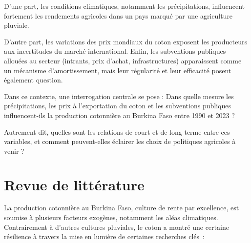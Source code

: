 \documentclass[
  letterpaper,
  DIV=11,
  numbers=noendperiod]{scrartcl}
\begin{document}
D'une part, les conditions climatiques, notamment les précipitations,
influencent fortement les rendements agricoles dans un pays marqué par
une agriculture pluviale.

D'autre part, les variations des prix mondiaux du coton exposent les
producteurs aux incertitudes du marché international. Enfin, les
subventions publiques allouées au secteur (intrants, prix d'achat,
infrastructures) apparaissent comme un mécanisme d'amortissement, mais
leur régularité et leur efficacité posent également question.

Dans ce contexte, une interrogation centrale se pose : Dans quelle
mesure les précipitations, les prix à l'exportation du coton et les
subventions publiques influencent-ils la production cotonnière au
Burkina Faso entre 1990 et 2023 ?

Autrement dit, quelles sont les relations de court et de long terme
entre ces variables, et comment peuvent-elles éclairer les choix de
politiques agricoles à venir ?

\section{Revue de littérature}\label{revue-de-littuxe9rature}

La production cotonnière au Burkina Faso, culture de rente par
excellence, est soumise à plusieurs facteurs exogènes, notamment les
aléas climatiques. Contrairement à d'autres cultures pluviales, le coton
a montré une certaine résilience à travers la mise en lumière de
certaines recherches clés~:
\end{document}
